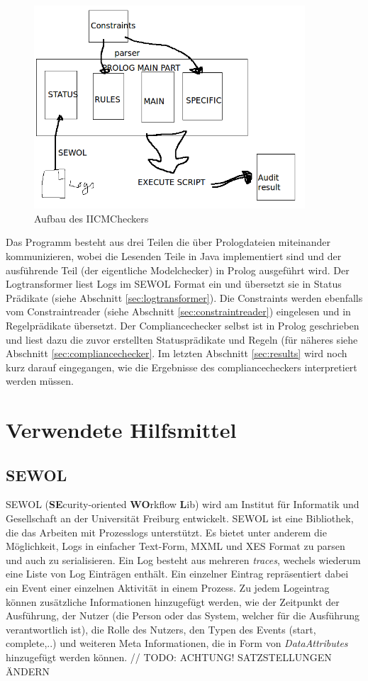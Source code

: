 \begin{figure}[ht]
	\centering
  \includegraphics[width=0.9\textwidth]{Figures/myProg}
	\caption{Aufbau des IICMCheckers}
	\label{fig: myprog}
\end{figure}
Das Programm besteht aus drei Teilen die über Prologdateien miteinander kommunizieren, wobei die Lesenden Teile in Java implementiert sind und der ausführende Teil (der eigentliche Modelchecker) in Prolog ausgeführt wird.
Der Logtransformer liest Logs im SEWOL \cite{SEWOL} Format ein und übersetzt sie in Status Prädikate (siehe Abschnitt \ref{sec:logtransformer}). 
Die Constraints werden ebenfalls vom Constraintreader (siehe Abschnitt \ref{sec:constraintreader}) eingelesen und in Regelprädikate übersetzt.
Der Compliancechecker selbst ist in Prolog geschrieben und liest dazu die zuvor erstellten Statusprädikate und Regeln (für näheres siehe Abschnitt \ref{sec:compliancechecker}. Im letzten Abschnitt \ref{sec:results} wird noch kurz darauf eingegangen, wie die Ergebnisse des compliancecheckers interpretiert werden müssen.

\section{Verwendete Hilfsmittel}
\subsection{SEWOL}
SEWOL (\textbf{SE}curity-oriented \textbf{WO}rkflow \textbf{L}ib) wird am Institut für Informatik und Gesellschaft an der Universität Freiburg entwickelt. SEWOL ist eine Bibliothek, die das Arbeiten mit Prozesslogs unterstützt. Es bietet unter anderem die Möglichkeit, Logs in einfacher Text-Form, MXML und XES Format zu parsen und auch zu serialisieren. Ein Log besteht aus mehreren \textit{traces}, wechels wiederum eine Liste von Log Einträgen enthält. Ein einzelner Eintrag repräsentiert dabei ein Event einer einzelnen Aktivität in einem Prozess. Zu jedem Logeintrag können zusätzliche Informationen hinzugefügt werden, wie der Zeitpunkt der Ausführung, der Nutzer (die Person oder das System, welcher für die Ausführung verantwortlich ist), die Rolle des Nutzers, den Typen des Events (start, complete,..) und weiteren Meta Informationen, die in Form von \textit{DataAttributes} hinzugefügt werden können. \cite{SEWOL} // TODO: ACHTUNG! SATZSTELLUNGEN ÄNDERN
